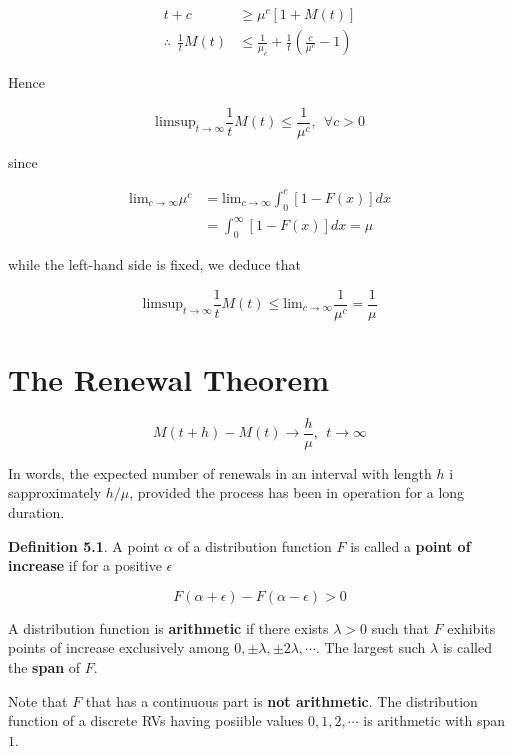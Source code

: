 \documentclass[12pt]{article}
\theoremstyle{nonumberbreak}
\begin{document}
$$
\begin{aligned}
t + c &\ge \mu^c \left[ 1 + M(t) \right] \\[8pt]
\therefore \ \ \frac{1}{t} M(t) &\le \frac{1}{\mu_c} + \frac{1}{t} \left( \frac{c}{\mu^c} -1 \right)
\end{aligned}
$$


Hence 

$$
\mathrm{lim sup}_{t \to \infty} \frac{1}{t} M(t) \le \frac{1}{\mu^c}, \ \ \forall c > 0
$$

since 

$$
\begin{aligned}
\mathrm{lim}_{c\to \infty} \mu^c &=\mathrm{lim}_{c \to \infty} \int_0^c \left[ 1- F(x) \right] dx  \\[8pt]
&= \int_0^\infty [1-F(x)] dx = \mu
\end{aligned}
$$

while the left-hand side is fixed, we deduce that

$$
\mathrm{lim sup}_{t \to \infty} \frac{1}{t} M(t) \le \mathrm{lim}_{c \to \infty} \frac{1}{\mu^c} = \frac{1}{\mu}
$$



\section{The Renewal Theorem}

$$
M(t + h) - M(t) \to \frac{h}{\mu}, \ \ t \to \infty
$$

In words, the expected number of renewals in an interval with length $h$ i sapproximately $h/\mu$, provided the process has been in operation for a long duration. 



\begin{theorem}
\textbf{Definition 5.1}. A point $\alpha$ of a distribution function $F$ is called a \textbf{point of increase} if for a positive $\epsilon$  

$$
F(\alpha + \epsilon) - F(\alpha - \epsilon) > 0
$$
\end{theorem}

A distribution function is \textbf{arithmetic} if there exists $\lambda >0$ such that $F$ exhibits points of increase exclusively among $0, \pm \lambda, \pm 2\lambda, \cdots$. The largest such $\lambda$ is called the \textbf{span} of $F$.

Note that $F$ that has a continuous part is \textbf{not arithmetic}. The distribution function of a discrete RVs having posiible values $0,1,2,\cdots$ is arithmetic with span $1$. 
\end{document}
